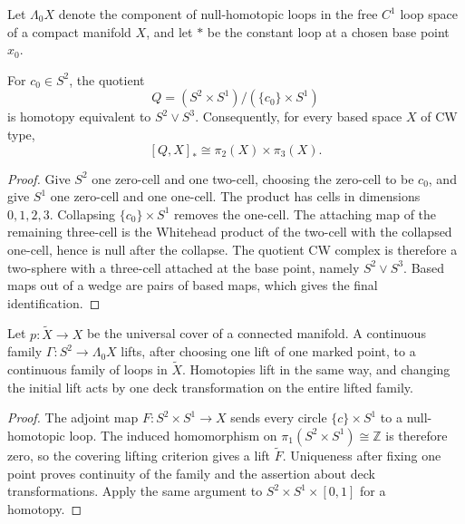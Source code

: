 Let $\Lambda_0X$ denote the component of null-homotopic loops in the free
$C^1$ loop space of a compact manifold $X$, and let $*$ be the constant loop
at a chosen base point $x_0$.

\begin{lemma}
\label{lem:loop-space-quotient-wedge}
\notready
For $c_0\in S^2$, the quotient
\[
 Q=(S^2\times S^1)/(\{c_0\}\times S^1)
\]
is homotopy equivalent to $S^2\vee S^3$.  Consequently, for every based
space $X$ of CW type,
\[
 [Q,X]_*\cong\pi_2(X)\times\pi_3(X).
\]
\end{lemma}

\begin{proof}
Give $S^2$ one zero-cell and one two-cell, choosing the zero-cell to be
$c_0$, and give $S^1$ one zero-cell and one one-cell.  The product has cells
in dimensions $0,1,2,3$.  Collapsing $\{c_0\}\times S^1$ removes the
one-cell.  The attaching map of the remaining three-cell is the Whitehead
product of the two-cell with the collapsed one-cell, hence is null after the
collapse.  The quotient CW complex is therefore a two-sphere with a
three-cell attached at the base point, namely $S^2\vee S^3$.  Based maps out
of a wedge are pairs of based maps, which gives the final identification.
\end{proof}

\begin{lemma}
\label{lem:loop-space-universal-cover-lift}
\notready
Let $p\colon\widetilde X\to X$ be the universal cover of a connected
manifold.  A continuous family $\Gamma\colon S^2\to\Lambda_0X$ lifts, after
choosing one lift of one marked point, to a continuous family of loops in
$\widetilde X$.  Homotopies lift in the same way, and changing the initial
lift acts by one deck transformation on the entire lifted family.
\end{lemma}

\begin{proof}
The adjoint map $F\colon S^2\times S^1\to X$ sends every circle
$\{c\}\times S^1$ to a null-homotopic loop.  The induced homomorphism on
$\pi_1(S^2\times S^1)\cong\mathbb Z$ is therefore zero, so the covering
lifting criterion gives a lift $\widetilde F$.  Uniqueness after fixing one
point proves continuity of the family and the assertion about deck
transformations.  Apply the same argument to
$S^2\times S^1\times[0,1]$ for a homotopy.
\end{proof}

